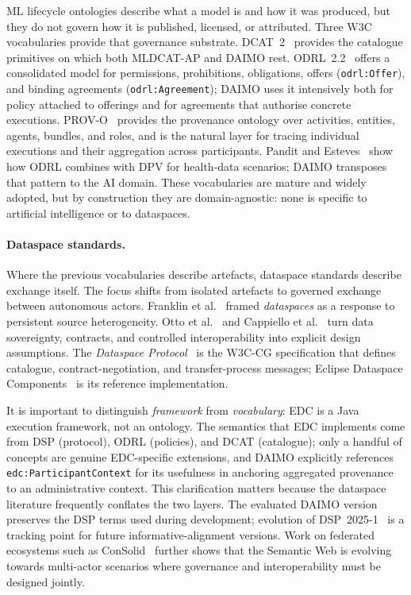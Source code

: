 \documentclass[Afour,sagev,times]{sagej}
\newcommand{\code}[1]{\texttt{#1}}
\begin{document}
ML lifecycle ontologies describe what a model is and how it was produced, but they do not govern how it is published, licensed, or attributed. Three W3C vocabularies provide that governance substrate. DCAT~2~\cite{dcat2} provides the catalogue primitives on which both MLDCAT-AP and DAIMO rest. ODRL~2.2~\cite{odrl22} offers a consolidated model for permissions, prohibitions, obligations, offers (\code{odrl:Offer}), and binding agreements (\code{odrl:Agreement}); DAIMO uses it intensively both for policy attached to offerings and for agreements that authorise concrete executions. PROV-O~\cite{provo} provides the provenance ontology over activities, entities, agents, bundles, and roles, and is the natural layer for tracing individual executions and their aggregation across participants. Pandit and Esteves~\cite{pandit-esteves} show how ODRL combines with DPV for health-data scenarios; DAIMO transposes that pattern to the AI domain. These vocabularies are mature and widely adopted, but by construction they are domain-agnostic: none is specific to artificial intelligence or to dataspaces.

\paragraph{Dataspace standards.}

Where the previous vocabularies describe artefacts, dataspace standards describe exchange itself. The focus shifts from isolated artefacts to governed exchange between autonomous actors. Franklin et al.~\cite{franklin05} framed \emph{dataspaces} as a response to persistent source heterogeneity. Otto et al.~\cite{otto19} and Cappiello et al.~\cite{cappiello22} turn data sovereignty, contracts, and controlled interoperability into explicit design assumptions. The \emph{Dataspace Protocol}~\cite{dsp} is the W3C-CG specification that defines catalogue, contract-negotiation, and transfer-process messages; Eclipse Dataspace Components~\cite{edc} is its reference implementation.

It is important to distinguish \emph{framework} from \emph{vocabulary}: EDC is a Java execution framework, not an ontology. The semantics that EDC implements come from DSP (protocol), ODRL (policies), and DCAT (catalogue); only a handful of concepts are genuine EDC-specific extensions, and DAIMO explicitly references \code{edc:ParticipantContext} for its usefulness in anchoring aggregated provenance to an administrative context. This clarification matters because the dataspace literature frequently conflates the two layers. The evaluated DAIMO version preserves the DSP terms used during development; evolution of DSP~2025-1~\cite{dsp2025} is a tracking point for future informative-alignment versions. Work on federated ecosystems such as ConSolid~\cite{werbrouck24} further shows that the Semantic Web is evolving towards multi-actor scenarios where governance and interoperability must be designed jointly.
\end{document}
